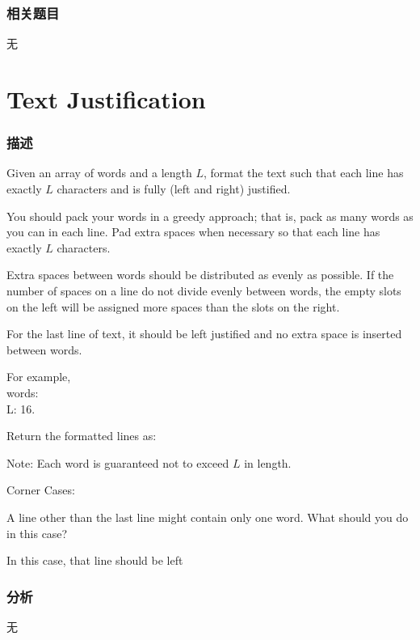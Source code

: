 \subsubsection{相关题目}
\begindot
\item 无
\myenddot


\section{Text Justification} %
\label{sec:text-justification}


\subsubsection{描述}
Given an array of words and a length $L$, format the text such that each line has exactly $L$ characters and is fully (left and right) justified.

You should pack your words in a greedy approach; that is, pack as many words as you can in each line. Pad extra spaces  when necessary so that each line has exactly $L$ characters.

Extra spaces between words should be distributed as evenly as possible. If the number of spaces on a line do not divide evenly between words, the empty slots on the left will be assigned more spaces than the slots on the right.

For the last line of text, it should be left justified and no extra space is inserted between words.

For example, \\
words:  \\
L: 16.

Return the formatted lines as:
\begin{Code}
\end{Code}

Note: Each word is guaranteed not to exceed $L$ in length.

Corner Cases:
\begindot
\item A line other than the last line might contain only one word. What should you do in this case?
\item In this case, that line should be left
\myenddot


\subsubsection{分析}
无


